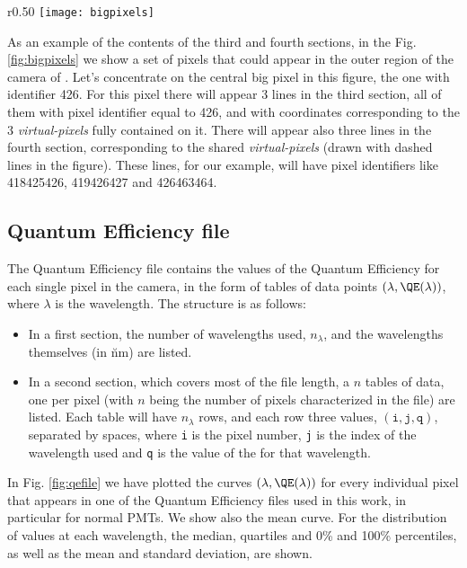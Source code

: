 \begin{wrapfigure}[17]{r}{0.50\textwidth}
  \centering
  \texttt{[image: bigpixels]}
  \caption{Example illustrating the sub-division of big pixels 
    (located in the outer ring of the camera of \MAGIC), for their
    characterization in the Pixels definition file }
  \label{fig:bigpixels}
\end{wrapfigure}
%
As an example of the contents of the third and fourth sections, in the
Fig. \ref{fig:bigpixels} we show a set of pixels that could appear in
the outer region of the camera of \MAGIC. Let's concentrate on the
central big pixel in this figure, the one with identifier 426. For
this pixel there will appear 3 lines in the third section, all of them
with pixel identifier equal to 426, and with coordinates corresponding
to the 3 \emph{virtual-pixels} fully contained on it. There will
appear also three lines in the fourth section, corresponding to the
shared \emph{virtual-pixels} (drawn with dashed lines in the figure).
These lines, for our example, will have pixel identifiers like
418425426, 419426427 and 426463464.

\subsection{Quantum Efficiency file}

The Quantum Efficiency file contains the values of the Quantum
Efficiency for each single pixel in the camera, in the form of tables
of data points $(\lambda, \QE(\lambda))$, where $\lambda$ is the wavelength. The
structure is as follows:

\begin{itemize}
\item In a first section, the number of wavelengths used, $n_\lambda$, and
  the wavelengths themselves (in \u{nm}) are listed.
  
\item In a second section, which covers most of the file length, a $n$
  tables of data, one per pixel (with $n$ being the number of pixels
  characterized in the file) are listed. Each table will have $n_\lambda$
  rows, and each row three values, $(\texttt{i}, \texttt{j},
  \texttt{q})$, separated by spaces, where \texttt{i} is the pixel
  number, \texttt{j} is the index of the wavelength used and
  \texttt{q} is the value of the \QE for that wavelength.
\end{itemize}

In Fig. \ref{fig:qefile} we have plotted the curves $(\lambda,
\QE(\lambda))$ for every individual pixel that appears in one of the
Quantum Efficiency files used in this work, in particular for normal
PMTs. We show also the mean \QE curve. For the distribution of \QE
values at each wavelength, the median, quartiles and 0\% and 100\%
percentiles, as well as the mean and standard deviation, are shown.

